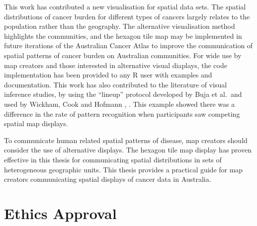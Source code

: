 \documentclass{monashthesis}
\begin{document}
This work has contributed a new visualisation for spatial data sets. The spatial distributions of cancer burden for different types of cancers largely relates to the population rather than the geography. The alternative visualisation method highlights the communities, and the hexagon tile map may be implemented in future iterations of the Australian Cancer Atlas to improve the communication of spatial patterns of cancer burden on Australian communities. For wide use by map creators and those interested in alternative visual diaplays, the code implementation has been provided to any R user with examples and documentation.
This work has also contributed to the literature of visual inference studies, by using the ``lineup'' protocol developed by Buja et al.~and used by Wickham, Cook and Hofmann \autocite{GIIV}, \autocite{GTPCCD}. This example showed there was a difference in the rate of pattern recognition when participants saw competing spatial map displays.

To communicate human related spatial patterns of disease, map creators should consider the use of alternative displays. The hexagon tile map display has proven effective in this thesis for communicating spatial distributions in sets of heterogeneous geographic units. This thesis provides a practical guide for map creators communicating spatial displays of cancer data in Australia.

\appendix



\hypertarget{ch:ethics}{%
\chapter{Ethics Approval}\label{ch:ethics}}



\printbibliography[heading=bibintoc]
\end{document}
